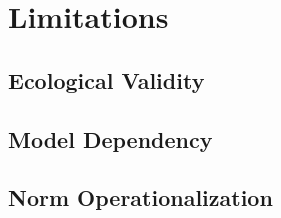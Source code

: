 \section{Limitations}
\label{sec:limitations}

\subsection{Ecological Validity}


\subsection{Model Dependency}


\subsection{Norm Operationalization}

